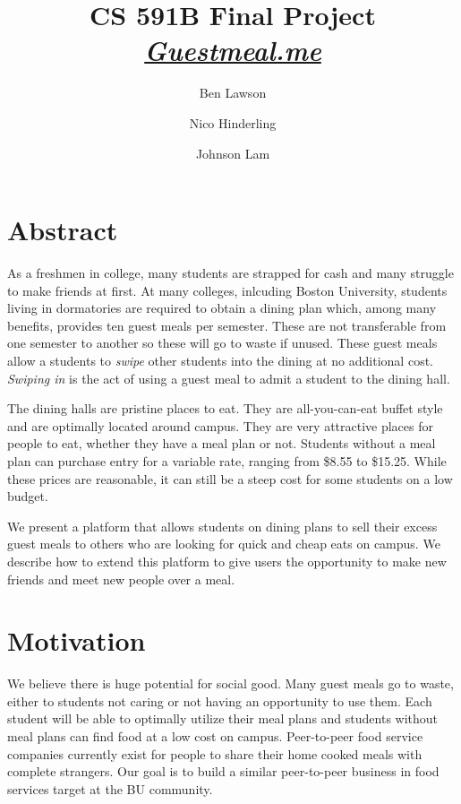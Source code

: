 \documentclass[column,12pt]{article}
\title{CS 591B Final Project\\
\href{http://www.guestmeal.me}{{\it Guestmeal.me }}
}
\author{Ben Lawson \\
		\and 
		Nico Hinderling\\
		\and
		Johnson Lam\\
}
\begin{document}
\maketitle    
\section{Abstract}
 
As a freshmen in college, many students are strapped for cash and many struggle to make friends at first. At many colleges, inlcuding Boston University, students living in dormatories are required to obtain a dining plan which, among many benefits, provides ten guest meals per semester. These are not transferable from one semester to another so these will go to waste if unused. These guest meals allow a students to {\it swipe} other students into the dining at no additional cost. {\it Swiping in} is the act of using a guest meal to admit a student to the dining hall.

The dining halls are pristine places to eat. They are all-you-can-eat buffet style and are optimally located around campus. They are very attractive places for people to eat, whether they have a meal plan or not. Students without a meal plan can purchase entry for a variable rate, ranging from \$8.55 to \$15.25. While these prices are reasonable, it can still be a steep cost for some students on a low budget. 

We present a platform that allows students on dining plans to sell their excess guest meals to others who are looking for quick and cheap eats on campus. We describe how to extend this platform to give users the opportunity to make new friends and meet new people over a meal.\\

\section{Motivation}

We believe there is huge potential for social good. Many guest meals go to waste, either to students not caring or not having an opportunity to use them. Each student will be able to optimally utilize their meal plans and students without meal plans can find food at a low cost on campus. Peer-to-peer food service companies currently exist for people to share their home cooked meals with complete strangers. Our goal is to build a similar peer-to-peer business in food services target at the BU community. 
\end{document}
